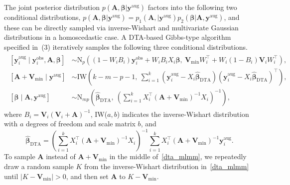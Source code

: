 \documentclass[12pt]{article}
\begin{document}
\begin{appendix}
The joint posterior distribution $p(\boldsymbol{A}, \boldsymbol{\beta}\vert  \boldsymbol{y}^{\textrm{aug}})$ factors into the following two conditional distributions, $p(\boldsymbol{A}, \boldsymbol{\beta}\vert  \boldsymbol{y}^{\textrm{aug}})=p_1(\boldsymbol{A}, \vert  \boldsymbol{y}^{\textrm{aug}})p_2(\boldsymbol{\beta}\vert \boldsymbol{A},  \boldsymbol{y}^{\textrm{aug}})$, and these can be directly sampled via inverse-Wishart and multivariate Gaussian distributions in a homoscedastic case. A DTA-based Gibbs-type algorithm specified in~(3) iteratively samples the following three conditional distributions.
\begin{align}
\begin{aligned}\label{dta_mlmm}
[\boldsymbol{y}^{\textrm{aug}}_i\mid \boldsymbol{y}^{\textrm{obs}}_i, \boldsymbol{A}, \boldsymbol{\beta}] &\sim \textrm{N}_p\!\left((1-W_iB_i) \boldsymbol{y}^{\textrm{obs}}_i+W_iB_iX_i\boldsymbol{\beta},~ \boldsymbol{V}\!_{\textrm{min}}W_i^\top+W_i(1-B_i)\boldsymbol{V}\!_iW_i^\top\right),\\
[\boldsymbol{A}+\boldsymbol{V}\!_{\textrm{min}}\mid \boldsymbol{y}^{\textrm{aug}}] & \sim \textrm{IW}\!\left(k-m-p-1,~ \sum_{i=1}^k(\boldsymbol{y}^{\textrm{aug}}_i-X_i\hat{\boldsymbol{\beta}}_{\textrm{DTA}})(\boldsymbol{y}^{\textrm{aug}}_i-X_i\hat{\boldsymbol{\beta}}_{\textrm{DTA}})^\top\right),\\
[\boldsymbol{\beta}\mid \boldsymbol{A}, \boldsymbol{y}^{\textrm{aug}}] &\sim \textrm{N}_{mp}\!\left(\hat{\boldsymbol{\beta}}_{\textrm{DTA}},~ \left(\sum_{i=1}^kX^\top_i (\boldsymbol{A}+\boldsymbol{V}\!_{\textrm{min}})^{-1}X_i\right)^{-1}\right),
\end{aligned}
\end{align}
where $B_i=\boldsymbol{V}\!_i(\boldsymbol{V}\!_i+\boldsymbol{A})^{-1}$, IW($a, b$) indicates the inverse-Wishart distribution with $a$ degrees of freedom and scale matrix $b$, and
\begin{equation}\nonumber
\hat{\boldsymbol{\beta}}_{\textrm{DTA}}= \left(\sum_{i=1}^kX^\top_i (\boldsymbol{A}+\boldsymbol{V}\!_{\textrm{min}})^{-1}X_i\right)^{-1}\sum_{i=1}^kX^\top_i(\boldsymbol{A}+\boldsymbol{V}\!_{\textrm{min}})^{-1} \boldsymbol{y}^{\textrm{aug}}_i.
\end{equation}
To  sample $\boldsymbol{A}$ instead of $\boldsymbol{A}+\boldsymbol{V}\!_{\textrm{min}}$ in the middle of~\eqref{dta_mlmm}, we   repeatedly draw a random sample $K$ from the inverse-Wishart distribution in~\eqref{dta_mlmm} until $\vert K- \boldsymbol{V}\!_{\textrm{min}}\vert>0$, and then  set $\boldsymbol{A}$ to $K- \boldsymbol{V}\!_{\textrm{min}}$. 




\end{appendix}
\end{document}
